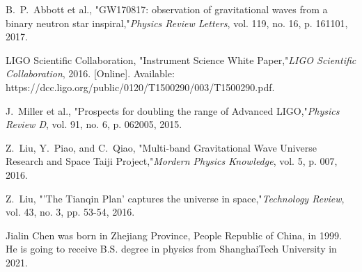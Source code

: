 \documentclass[journal,comsoc,twoside]{IEEEtran}
\begin{document}
\begin{thebibliography}{1}
B.~P.~Abbott et al., "GW170817: observation of gravitational waves from a binary neutron star inspiral,"\emph{Physics Review Letters}, vol. 119, no. 16, p. 161101, 2017.

LIGO Scientific Collaboration, "Instrument Science White Paper,"\emph{LIGO Scientific Collaboration}, 2016. [Online]. Available: https://dcc.ligo.org/public/0120/T1500290/003/T1500290.pdf.

J.~Miller et al., "Prospects for doubling the range of Advanced LIGO,"\emph{Physics Review D}, vol. 91, no. 6, p. 062005, 2015.

Z.~Liu, Y.~Piao, and C.~Qiao, "Multi-band Gravitational Wave Universe Research and Space Taiji Project,"\emph{Mordern Physics Knowledge}, vol. 5, p. 007, 2016.

Z.~Liu, "'The Tianqin Plan' captures the universe in space,"\emph{Technology Review}, vol. 43, no. 3, pp. 53-54, 2016.

\end{thebibliography}

%

\begin{IEEEbiographynophoto}{Jialin Chen}
was born in Zhejiang Province, People Republic of China, in 1999. He is going to receive B.S. degree in physics from ShanghaiTech University in 2021.
\end{IEEEbiographynophoto}







\end{document}
